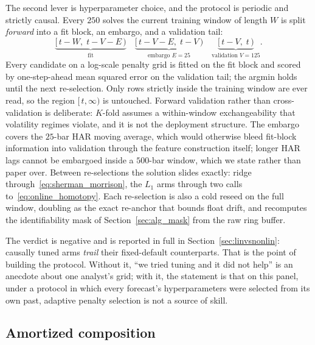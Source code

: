 The second lever is hyperparameter choice, and the protocol is periodic and
strictly causal. Every $250$ solves the current training window of length $W$ is
split \emph{forward} into a fit block, an embargo, and a validation tail:
\begin{equation}
\underbrace{[\,t-W,\; t-V-E\,)}_{\text{fit}}
\quad
\underbrace{[\,t-V-E,\; t-V\,)}_{\text{embargo } E = 25}
\quad
\underbrace{[\,t-V,\; t\,)}_{\text{validation } V = 125}.
\label{eq:forward_split}
\end{equation}
Every candidate on a log-scale penalty grid is fitted on the fit block and scored
by one-step-ahead mean squared error on the validation tail; the argmin holds until
the next re-selection. Only rows strictly inside the training window are ever read,
so the region $[\,t,\infty)$ is untouched. Forward validation rather than
cross-validation is deliberate: $K$-fold assumes a within-window exchangeability
that volatility regimes violate, and it is not the deployment structure. The
embargo covers the $25$-bar HAR moving average, which would otherwise bleed
fit-block information into validation through the feature construction itself;
longer HAR lags cannot be embargoed inside a $500$-bar window, which we state
rather than paper over. Between re-selections the solution slides exactly:
ridge through~\eqref{eq:sherman_morrison}, the $L_1$ arms through two calls
to~\eqref{eq:online_homotopy}. Each re-selection is also a cold reseed on the full
window, doubling as the exact re-anchor that bounds float drift, and recomputes the
identifiability mask of Section~\ref{sec:alg_mask} from the raw ring buffer.

The verdict is negative and is reported in full in
Section~\ref{sec:linvsnonlin}: causally tuned arms \emph{trail} their fixed-default
counterparts. That is the point of building the protocol. Without it, ``we tried
tuning and it did not help'' is an anecdote about one analyst's grid; with it, the
statement is that on this panel, under a protocol in which every forecast's
hyperparameters were selected from its own past, adaptive penalty selection is not
a source of skill.

\subsection{Amortized composition}
\label{sec:alg_amortized}

